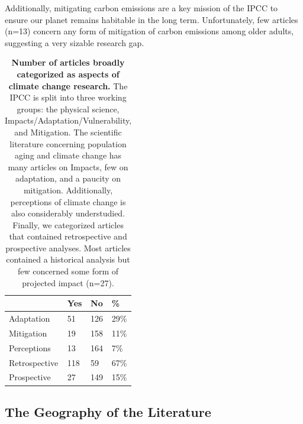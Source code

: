 \documentclass[12pt]{article}
\begin{document}
Additionally, mitigating carbon emissions are a key mission of the IPCC
to ensure our planet remains habitable in the long term. Unfortunately,
few articles (n=13) concern any form of mitigation of carbon emissions
among older adults, suggesting a very sizable research gap.

\begin{table}[]
\centering
\begin{tabular}{llll}
              & Yes & No  & \%   \\ \hline
Adaptation    & 51  & 126 & 29\% \\
Mitigation    & 19  & 158 & 11\% \\
Perceptions   & 13  & 164 & 7\%  \\ \hline
Retrospective & 118 & 59  & 67\% \\
Prospective   & 27  & 149 & 15\% \\ \hline
\end{tabular}
\caption{\textbf{Number of articles broadly categorized as aspects of climate change research.} The IPCC is split into three working groups: the physical science, Impacts/Adaptation/Vulnerability, and Mitigation. The scientific literature concerning population aging and climate change has many articles on Impacts, few on adaptation, and a paucity on mitigation. Additionally, perceptions of climate change is also considerably understudied. Finally, we categorized articles that contained retrospective and prospective analyses. Most articles contained a historical analysis but few concerned some form of projected impact (n=27).}\label{table-broad} 
\end{table}

\hypertarget{the-geography-of-the-literature}{%
\subsection{The Geography of the
Literature}\label{the-geography-of-the-literature}}
\end{document}
